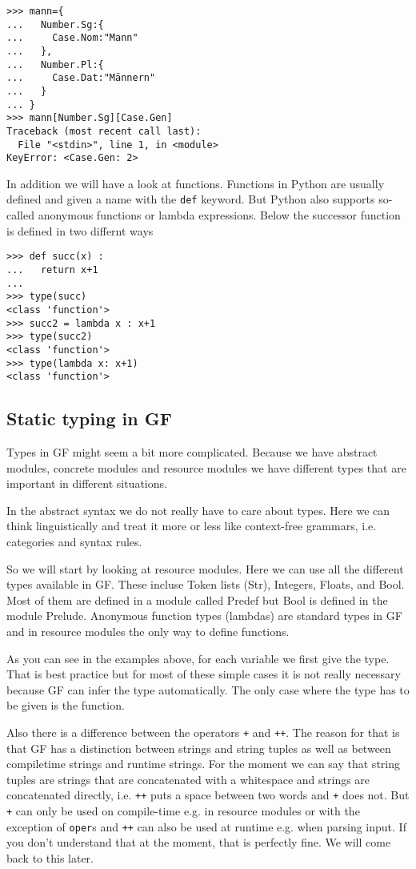 \documentclass{scrartcl}
\begin{document}
\begin{verbatim}
>>> mann={
...   Number.Sg:{
...     Case.Nom:"Mann"
...   },
...   Number.Pl:{
...     Case.Dat:"Männern"
...   }
... }
>>> mann[Number.Sg][Case.Gen]
Traceback (most recent call last):
  File "<stdin>", line 1, in <module>
KeyError: <Case.Gen: 2>
\end{verbatim}

In addition we will have a look at functions. Functions in Python are usually defined and given a name with the \texttt{def} keyword. But Python also supports so-called anonymous functions or lambda expressions. Below the successor function is defined in two differnt ways

\begin{verbatim}
>>> def succ(x) :
...   return x+1
... 
>>> type(succ)
<class 'function'>
>>> succ2 = lambda x : x+1
>>> type(succ2)
<class 'function'>
>>> type(lambda x: x+1)
<class 'function'>
\end{verbatim}

\subsection{Static typing in GF}

Types in GF might seem a bit more complicated. Because we have abstract modules, concrete modules and resource modules we have different types that are important in different situations.

In the abstract syntax we do not really have to care about types. Here we can think linguistically and treat it more or less like context-free grammars, i.e. categories and syntax rules.

So we will start by looking at resource modules. Here we can use all the different types available in GF. These incluse Token lists (Str), Integers, Floats, and Bool. Most of them are defined in a module called Predef but Bool is defined in the module Prelude. Anonymous function types (lambdas) are standard types in GF and in resource modules the only way to define functions.



As you can see in the examples above, for each variable we first give the type. That is best practice but for most of these simple cases it is not really necessary because GF can infer the type automatically. The only case where the type has to be given is the function.

Also there is a difference between the operators \texttt{+} and \texttt{++}. The reason for that is that GF has a distinction between strings and string tuples as well as between compiletime strings and runtime strings. For the moment we can say that string tuples are strings that are concatenated with a whitespace and strings are concatenated directly, i.e. \texttt{++} puts a space between two words and \texttt{+} does not. But \texttt{+} can only be used on compile-time e.g. in resource modules or with the exception of \texttt{oper}s and \texttt{++} can also be used at runtime e.g. when parsing input. If you don't understand that at the moment, that is perfectly fine. We will come back to this later.
\end{document}
